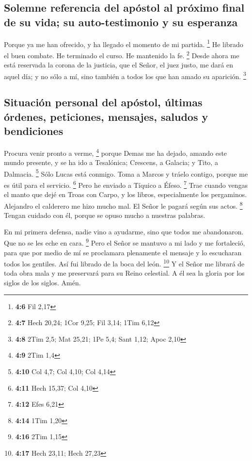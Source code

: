 \begin{paracol}{2}
\hypertarget{solemne-referencia-del-apuxf3stol-al-pruxf3ximo-final-de-su-vida-su-auto-testimonio-y-su-esperanza}{%
\subsection{Solemne referencia del apóstol al próximo final de su vida;
su auto-testimonio y su
esperanza}\label{solemne-referencia-del-apuxf3stol-al-pruxf3ximo-final-de-su-vida-su-auto-testimonio-y-su-esperanza}}

 Porque ya me han ofrecido, y ha llegado el momento de mi
partida. \footnote{\textbf{4:6} Fil 2,17}  He librado el
buen combate. He terminado el curso. He mantenido la fe. \footnote{\textbf{4:7}
  Hech 20,24; 1Cor 9,25; Fil 3,14; 1Tim 6,12}  Desde ahora
me está reservada la corona de la justicia, que el Señor, el juez justo,
me dará en aquel día; y no sólo a mí, sino también a todos los que han
amado su aparición. \footnote{\textbf{4:8} 2Tim 2,5; Mat 25,21; 1Pe 5,4;
  Sant 1,12; Apoc 2,10}

\hypertarget{situaciuxf3n-personal-del-apuxf3stol-uxfaltimas-uxf3rdenes-peticiones-mensajes-saludos-y-bendiciones}{%
\subsection{Situación personal del apóstol, últimas órdenes, peticiones,
mensajes, saludos y
bendiciones}\label{situaciuxf3n-personal-del-apuxf3stol-uxfaltimas-uxf3rdenes-peticiones-mensajes-saludos-y-bendiciones}}

 Procura venir pronto a verme, \footnote{\textbf{4:9} 2Tim
  1,4}  porque Demas me ha dejado, amando este mundo
presente, y se ha ido a Tesalónica; Crescens, a Galacia; y Tito, a
Dalmacia. \footnote{\textbf{4:10} Col 4,7; Col 4,10; Col 4,14}
 Sólo Lucas está conmigo. Toma a Marcos y tráelo contigo,
porque me es útil para el servicio. \footnote{\textbf{4:11} Hech 15,37;
  Col 4,10}  Pero he enviado a Tíquico a Éfeso.
\footnote{\textbf{4:12} Efes 6,21}  Trae cuando vengas el
manto que dejé en Troas con Carpo, y los libros, especialmente los
pergaminos.  Alejandro el calderero me hizo mucho mal. El
Señor le pagará según sus actos. \footnote{\textbf{4:14} 1Tim 1,20}
 Tengan cuidado con él, porque se opuso mucho a nuestras
palabras.

 En mi primera defensa, nadie vino a ayudarme, sino que
todos me abandonaron. Que no se les eche en cara. \footnote{\textbf{4:16}
  2Tim 1,15}  Pero el Señor se mantuvo a mi lado y me
fortaleció, para que por medio de mí se proclamara plenamente el mensaje
y lo escucharan todos los gentiles. Así fui librado de la boca del león.
\footnote{\textbf{4:17} Hech 23,11; Hech 27,23}  Y el
Señor me librará de toda obra mala y me preservará para su Reino
celestial. A él sea la gloria por los siglos de los siglos. Amén.


\end{paracol}
